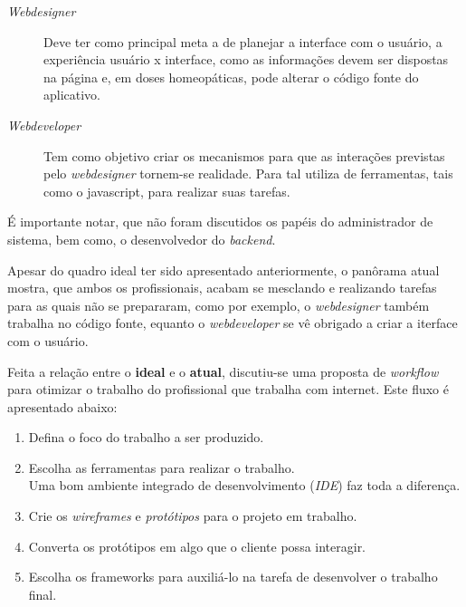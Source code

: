 \documentclass[a4paper,12pt]{report}
\begin{document}
        \begin{description}

            \item[\emph{Webdesigner}] Deve ter como principal meta a de planejar
            a interface com o usu\'{a}rio, a experi\^{e}ncia usu\'{a}rio x
            interface, como as informa\c{c}\~{o}es devem ser dispostas na
            p\'{a}gina e, em doses homeop\'{a}ticas, pode alterar o c\'{o}digo
            fonte do aplicativo.

            \item[\emph{Webdeveloper}] Tem como objetivo criar os mecanismos para
            que as intera\c{c}\~{o}es previstas pelo \emph{webdesigner} tornem-se
            realidade. Para tal utiliza de ferramentas, tais como o javascript,
            para realizar suas tarefas.

        \end{description}

        \'{E} importante notar, que n\~{a}o foram discutidos os pap\'{e}is do
        administrador de sistema, bem como, o desenvolvedor do \emph{backend}.

        Apesar do quadro ideal ter sido apresentado anteriormente, o pan\^{o}rama
        atual mostra, que ambos os profissionais, acabam se mesclando e
        realizando tarefas para as quais n\~{a}o se prepararam, como por exemplo,
        o \emph{webdesigner} tamb\'{e}m trabalha no c\'{o}digo fonte, equanto o
        \emph{webdeveloper} se v\^{e} obrigado a criar a iterface com o
        usu\'{a}rio.

        Feita a rela\c{c}\~{a}o entre o \textbf{ideal} e o \textbf{atual},
        discutiu-se uma proposta de \emph{workflow} para otimizar o trabalho do
        profissional que trabalha com internet. Este fluxo \'{e} apresentado
        abaixo:

        \begin{enumerate}

            \item Defina o foco do trabalho a ser produzido.

            \item Escolha as ferramentas para realizar o trabalho.
                \\Uma bom ambiente integrado de desenvolvimento (\emph{IDE})
                faz toda a diferen\c{c}a.

            \item Crie os \emph{wireframes} e \emph{prot\'{o}tipos} para o
            projeto em trabalho.

            \item Converta os prot\'{o}tipos em algo que o cliente possa
            interagir.

            \item Escolha os frameworks para auxili\'{a}-lo na tarefa de
            desenvolver o trabalho final.

        \end{enumerate}
\end{document}
